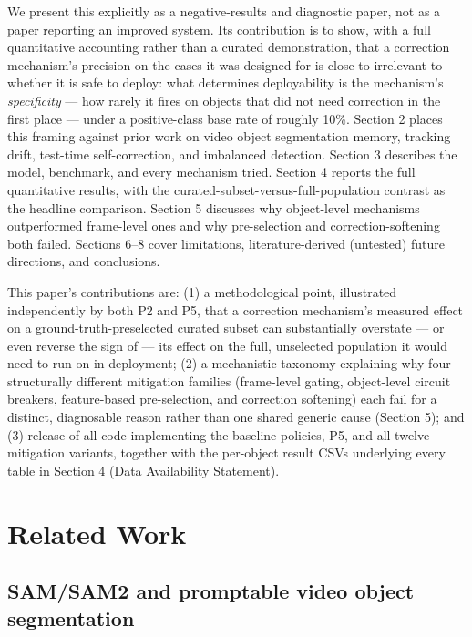 \documentclass[11pt]{article}
\begin{document}
We present this explicitly as a negative-results and diagnostic paper, not as a paper reporting an improved system. Its contribution is to show, with a full quantitative accounting rather than a curated demonstration, that a correction mechanism's precision on the cases it was designed for is close to irrelevant to whether it is safe to deploy: what determines deployability is the mechanism's \emph{specificity} — how rarely it fires on objects that did not need correction in the first place — under a positive-class base rate of roughly 10\%. Section 2 places this framing against prior work on video object segmentation memory, tracking drift, test-time self-correction, and imbalanced detection. Section 3 describes the model, benchmark, and every mechanism tried. Section 4 reports the full quantitative results, with the curated-subset-versus-full-population contrast as the headline comparison. Section 5 discusses why object-level mechanisms outperformed frame-level ones and why pre-selection and correction-softening both failed. Sections 6–8 cover limitations, literature-derived (untested) future directions, and conclusions.

This paper's contributions are: (1) a methodological point, illustrated independently by both P2 and P5, that a correction mechanism's measured effect on a ground-truth-preselected curated subset can substantially overstate — or even reverse the sign of — its effect on the full, unselected population it would need to run on in deployment; (2) a mechanistic taxonomy explaining why four structurally different mitigation families (frame-level gating, object-level circuit breakers, feature-based pre-selection, and correction softening) each fail for a distinct, diagnosable reason rather than one shared generic cause (Section 5); and (3) release of all code implementing the baseline policies, P5, and all twelve mitigation variants, together with the per-object result CSVs underlying every table in Section 4 (Data Availability Statement).

\section{Related Work}

\subsection{SAM/SAM2 and promptable video object segmentation}
\end{document}
